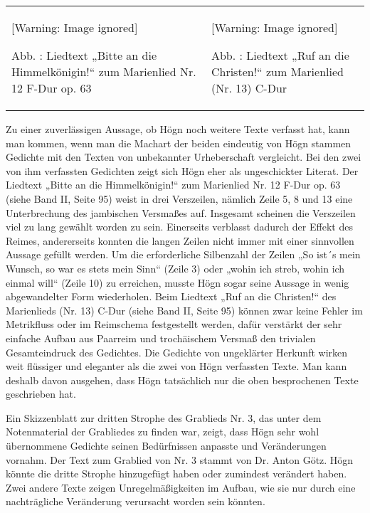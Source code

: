 \documentclass[a4paper]{article}
\newcounter{Abb}
\renewcommand\theAbb{\arabic{Abb}}
\begin{document}
\begin{flushleft}
\tablefirsthead{}
\tablehead{}
\tabletail{}
\tablelasttail{}
\begin{supertabular}{m{7.589cm}m{7.4040003cm}}
  [Warning: Image ignored] %
 
Abb. \stepcounter{Abb}{\theAbb}: Liedtext „Bitte an die Himmelkönigin!“
zum Marienlied Nr. 12 F-Dur op. 63 &
  [Warning: Image ignored] %
 
Abb. \stepcounter{Abb}{\theAbb}: Liedtext „Ruf an die Christen!“ zum
Marienlied (Nr. 13) C-Dur\\
\end{supertabular}
\end{flushleft}
Zu einer zuverlässigen Aussage, ob Högn noch weitere Texte verfasst hat,
kann man kommen, wenn man die Machart der beiden eindeutig von Högn
stammen Gedichte mit den Texten von unbekannter Urheberschaft
vergleicht. Bei den zwei von ihm verfassten Gedichten zeigt sich Högn
eher als ungeschickter Literat. Der Liedtext „Bitte an die
Himmelkönigin!“ zum Marienlied Nr. 12 F-Dur op. 63 (siehe Band II,
Seite 95) weist in drei Verszeilen, nämlich Zeile 5, 8 und 13 eine
Unterbrechung des jambischen Versmaßes auf. Insgesamt scheinen die
Verszeilen viel zu lang gewählt worden zu sein. Einerseits verblasst
dadurch der Effekt des Reimes, andererseits konnten die langen Zeilen
nicht immer mit einer sinnvollen Aussage gefüllt werden. Um die
erforderliche Silbenzahl der Zeilen „So ist´s mein Wunsch, so war es
stets mein Sinn“ (Zeile 3) oder „wohin ich streb, wohin ich einmal
will“ (Zeile 10) zu erreichen, musste Högn sogar seine Aussage in wenig
abgewandelter Form wiederholen. Beim Liedtext „Ruf an die Christen!“
des Marienlieds (Nr. 13) C-Dur (siehe Band II, Seite 95) können zwar
keine Fehler im Metrikfluss oder im Reimschema festgestellt werden,
dafür verstärkt der sehr einfache Aufbau aus Paarreim und trochäischem
Versmaß den trivialen Gesamteindruck des Gedichtes. Die Gedichte von
ungeklärter Herkunft wirken weit flüssiger und eleganter als die zwei
von Högn verfassten Texte. Man kann deshalb davon ausgehen, dass Högn
tatsächlich nur die oben besprochenen Texte geschrieben hat. 

Ein Skizzenblatt zur dritten Strophe des Grablieds Nr. 3, das unter dem
Notenmaterial der Grabliedes zu finden war, zeigt, dass Högn sehr wohl
übernommene Gedichte seinen Bedürfnissen anpasste und Veränderungen
vornahm. Der Text zum Grablied von Nr. 3 stammt von Dr. Anton Götz.
Högn könnte die dritte Strophe hinzugefügt haben oder zumindest
verändert haben. Zwei andere Texte zeigen Unregelmäßigkeiten im Aufbau,
wie sie nur durch eine nachträgliche Veränderung verursacht worden sein
könnten. 
\end{document}
